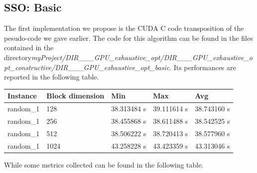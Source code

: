 \documentclass[12pt]{extarticle}
\begin{document}
\subsection{SSO: Basic}
The first implementation we propose is the CUDA C code transposition of the pesudo-code we gave earlier.\newline
The code for this algorithm can be found in the files contained in the directory\newline \emph{myProject/DIR\_\_\_GPU\_exhaustive\_opt/DIR\_\_\_GPU\_exhaustive\_opt\_constructive/\newline DIR\_\_\_GPU\_exhaustive\_opt\_basic}. Its performances are reported in the following table.
\begin{center}
\begin{tabular}{ | m{2.2cm} | m{3.2cm} | m{2.2cm} | m{2.2cm} | m{2.2cm} |}
 \hline
 Instance & Block dimension & Min & Max & Avg\\
 \hline
 random\_1 & 128 & 38.313484 s & 39.111614 s & 38.743160 s\\
 \hline
 random\_1 & 256 & 38.455868 s & 38.611488 s & 38.542525 s\\
 \hline
 random\_1 & 512 & 38.506222 s & 38.720413 s & 38.577960 s\\
 \hline
 random\_1 & 1024 & 43.258228 s & 43.423359 s & 43.313046 s\\
 \hline
 \end{tabular}
 \end{center}
 While some metrics collected can be found in the following table.
\begin{center}
\noindent%
\end{center}
\end{document}

